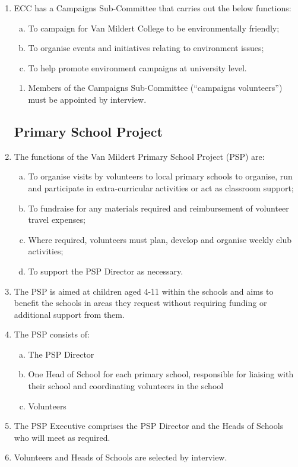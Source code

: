 \documentclass[12pt]{article}
\begin{document}
\begin{enumerate}
    \item ECC has a Campaigns Sub-Committee that carries out the below functions:
    \begin{enumerate}[(a)]
        \item To campaign for Van Mildert College to be environmentally friendly;
        \item To organise events and initiatives relating to environment issues;
        \item To help promote environment campaigns at university level.
    \end{enumerate}
    \begin{enumerate}
        \item Members of the Campaigns Sub-Committee (``campaigns volunteers'') must be appointed by interview.
    \end{enumerate}
    \subsection{Primary School Project}
    \item The functions of the Van Mildert Primary School Project (PSP) are:
    \begin{enumerate}[(a)]
        \item To organise visits by volunteers to local primary schools to organise, run and participate in extra-curricular activities or act as classroom support;
        \item To fundraise for any materials required and reimbursement of volunteer travel expenses;
        \item Where required, volunteers must plan, develop and organise weekly club activities;
        \item To support the PSP Director as necessary.
    \end{enumerate}
    \item The PSP is aimed at children aged 4-11 within the schools and aims to benefit the schools in areas they request without requiring funding or additional support from them.
    \item The PSP consists of:
    \begin{enumerate}[(a)]
        \item The PSP Director
        \item One Head of School for each primary school, responsible for liaising with their school and coordinating volunteers in the school
        \item Volunteers
    \end{enumerate}
    \item The PSP Executive comprises the PSP Director and the Heads of Schools who will meet as required.
    \item Volunteers and Heads of Schools are selected by interview.

\end{enumerate}
\end{document}
